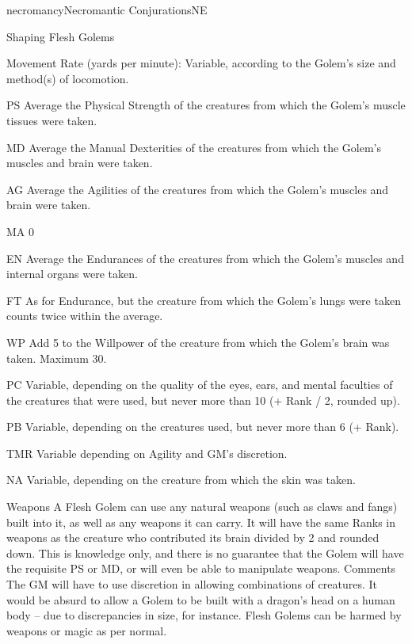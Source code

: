 \begin{College}[1.1]{necromancy}{Necromantic Conjurations}{NE}
\begin{ritual}[R-4]{Shaping Flesh Golems}
\begin{effects}
\begin{Description}
\item[Movement Rate] (yards per minute): Variable, according to the
  Golem’s size and method(s) of locomotion.

\item[PS] Average the Physical Strength of the creatures 
from which the Golem’s muscle tissues were taken. 

\item[MD] Average the Manual Dexterities of the creatures from which
  the Golem’s muscles and brain were taken.
  
\item[AG] Average the Agilities of the creatures from 
which the Golem’s muscles and brain were taken. 

\item[MA] 0 

\item[EN] Average the Endurances of the creatures from which the
  Golem’s muscles and internal organs were taken.

\item[FT] As for Endurance, but the creature from which the Golem’s
  lungs were taken counts twice within the average.

\item[WP] Add 5 to the Willpower of the creature from which the
  Golem’s brain was taken. Maximum 30.

\item[PC] Variable, depending on the quality of the eyes, ears, and
  mental faculties of the creatures that were used, but never more
  than 10 (+ Rank / 2, rounded up).

\item[PB] Variable, depending on the creatures used, but never more
  than 6 (+ Rank).

\item[TMR] Variable depending on Agility and GM’s discretion.

\item[NA] Variable, depending on the creature from which the skin was
  taken.

\item[Weapons] A Flesh Golem can use any natural weapons (such as
  claws and fangs) built into it, as well as any weapons it can
  carry. It will have the same Ranks in weapons as the creature who
  contributed its brain divided by 2 and rounded down.  This is
  knowledge only, and there is no guarantee that the Golem will have
  the requisite PS or MD, or will even be able to manipulate weapons.
  Comments The GM will have to use discretion in allowing combinations
  of creatures.  It would be absurd to allow a Golem to be built with
  a dragon’s head on a human body – due to discrepancies in size, for
  instance. Flesh Golems can be harmed by weapons or magic as per
  normal.
\end{Description}


\end{effects}
\end{ritual}
\end{College}
